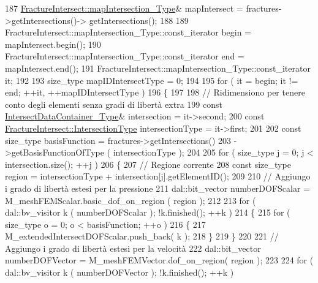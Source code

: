 \begin{DoxyCode}
187         \hyperlink{classFractureIntersect_a4eea7d0aca48cdd36ea1756e75280332}{FractureIntersect::mapIntersection\_Type}& mapIntersect = 
      fractures->getIntersections()-> getIntersections();
188 
189         FractureIntersect::mapIntersection\_Type::const\_iterator begin = mapIntersect.begin();
190         FractureIntersect::mapIntersection\_Type::const\_iterator end = mapIntersect.end();
191         FractureIntersect::mapIntersection\_Type::const\_iterator it;
192 
193         size\_type mapIDIntersectType = 0;
194         
195         \textcolor{keywordflow}{for} ( it = begin; it != end; ++it, ++mapIDIntersectType )
196         \{
197 
198                 \textcolor{comment}{// Ridimensiono per tenere conto degli elementi senza gradi di libertà extra}
199                 \textcolor{keyword}{const} \hyperlink{IntersectData_8h_a822ec3b760dfb603e1cf0bfe3ad5636a}{IntersectDataContainer\_Type}& intersection = it->second;
200                 \textcolor{keyword}{const} \hyperlink{classFractureIntersect_a9a4e4a784fa4c8e359767ed543f89dc5}{FractureIntersect::IntersectionType} 
      intersectionType = it->first;
201 
202                 \textcolor{keyword}{const} size\_type basisFunction = fractures->getIntersections()
203                                                 ->getBasisFunctionOfType ( intersectionType );
204 
205                 \textcolor{keywordflow}{for} ( size\_type j = 0; j < intersection.size(); ++j )
206                 \{
207                         \textcolor{comment}{// Regione corrente}
208                         \textcolor{keyword}{const} size\_type region = intersectionType + intersection[j].getElementID();
209 
210                         \textcolor{comment}{// Aggiungo i grado di libertà estesi per la pressione}
211                         dal::bit\_vector numberDOFScalar = M\_meshFEMScalar.basic\_dof\_on\_region ( region );
212 
213                         \textcolor{keywordflow}{for} ( dal::bv\_visitor k ( numberDOFScalar ); !k.finished(); ++k )
214                         \{
215                                 \textcolor{keywordflow}{for} ( size\_type o = 0; o < basisFunction; ++o )
216                                 \{
217                                         M\_extendedIntersectDOFScalar.push\_back( k );
218                                 \}
219                         \}
220 
221                         \textcolor{comment}{// Aggiungo i grado di libertà estesi per la velocità}
222                         dal::bit\_vector numberDOFVector = M\_meshFEMVector.dof\_on\_region( region );
223 
224                         \textcolor{keywordflow}{for} ( dal::bv\_visitor k ( numberDOFVector ); !k.finished(); ++k )

\end{DoxyCode}
